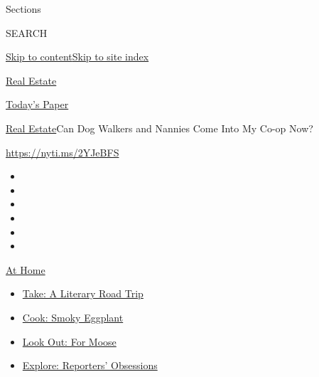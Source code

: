 Sections

SEARCH

\protect\hyperlink{site-content}{Skip to
content}\protect\hyperlink{site-index}{Skip to site index}

\href{https://www.nytimes.com/section/realestate}{Real Estate}

\href{https://myaccount.nytimes.com/auth/login?response_type=cookie\&client_id=vi}{}

\href{https://www.nytimes.com/section/todayspaper}{Today's Paper}

\href{/section/realestate}{Real Estate}\textbar{}Can Dog Walkers and
Nannies Come Into My Co-op Now?

\url{https://nyti.ms/2YJeBFS}

\begin{itemize}
\item
\item
\item
\item
\item
\item
\end{itemize}

\href{https://www.nytimes.com/spotlight/at-home?action=click\&pgtype=Article\&state=default\&region=TOP_BANNER\&context=at_home_menu}{At
Home}

\begin{itemize}
\tightlist
\item
  \href{https://www.nytimes.com/2020/07/28/books/time-for-a-literary-road-trip.html?action=click\&pgtype=Article\&state=default\&region=TOP_BANNER\&context=at_home_menu}{Take:
  A Literary Road Trip}
\item
  \href{https://www.nytimes.com/2020/07/29/magazine/bored-with-your-home-cooking-some-smoky-eggplant-will-fix-that.html?action=click\&pgtype=Article\&state=default\&region=TOP_BANNER\&context=at_home_menu}{Cook:
  Smoky Eggplant}
\item
  \href{https://www.nytimes.com/2020/07/27/travel/moose-michigan-isle-royale.html?action=click\&pgtype=Article\&state=default\&region=TOP_BANNER\&context=at_home_menu}{Look
  Out: For Moose}
\item
  \href{https://www.nytimes.com/interactive/2020/at-home/even-more-reporters-editors-diaries-lists-recommendations.html?action=click\&pgtype=Article\&state=default\&region=TOP_BANNER\&context=at_home_menu}{Explore:
  Reporters' Obsessions}
\end{itemize}

